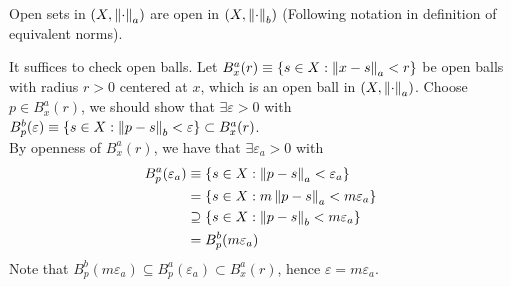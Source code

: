 \documentclass{article}
\begin{document}
\begin{proposition}\rm\nextline
	Open sets in $(X,\left\|{\cdot}\right\|_a)$ are open in $(X,\left\|{\cdot}\right\|_b)$ (Following notation in definition of equivalent norms).
	\begin{pf}{}{}
	It suffices to check open balls. Let $B^a_x(r)\equiv\{s\in X:\left\|{x-s}\right\|_a<r\}$ be open balls with radius $r>0$ centered at $x$, which is an open ball in $(X,\left\|{\cdot}\right\|_a)$. Choose $p\in B^a_x(r)$, we should show that $\exists \varepsilon>0$ with $B^b_p(\varepsilon)\equiv\{s\in X:\left\|{p-s}\right\|_b<\varepsilon\}\subset B^a_x(r)$.\\
	By openness of $B^a_x(r)$, we have that $\exists \varepsilon_a>0$ with
	\begin{equation}
		\begin{split}\nonumber
			B^a_p(\varepsilon_a)&\equiv\{s\in X:\left\|{p-s}\right\|_a<\varepsilon_a\}\\
			&=\{s\in X:m\left\|{p-s}\right\|_a<m\varepsilon_a\}\\
			&\supseteq \{s\in X:\left\|{p-s}\right\|_b<m\varepsilon_a\}\\
			&=B^b_p(m\varepsilon_a)
		\end{split}
	\end{equation}
	Note that $B^b_p(m\varepsilon_a)\subseteq B^a_p(\varepsilon_a)\subset B^a_x(r)$, hence $\varepsilon=m\varepsilon_a$.
	\end{pf}
	
\end{proposition}
\end{document}
